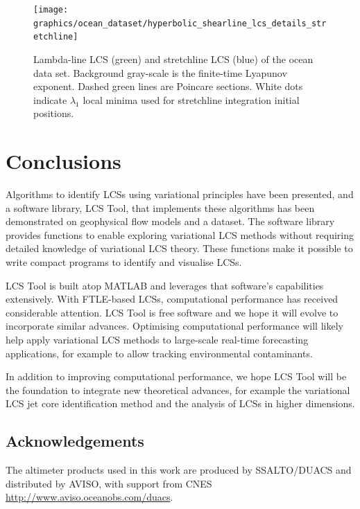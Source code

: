 \documentclass{article}
\begin{document}
\begin{figure}
\begin{center}
\texttt{[image: graphics/ocean\_dataset/hyperbolic\_shearline\_lcs\_details\_stretchline]}
\end{center}
\caption{Lambda-line LCS (green) and stretchline LCS (blue) of the ocean data set. Background gray-scale is the finite-time Lyapunov exponent. Dashed green lines are Poincare sections. White dots indicate $\lambda_1$ local minima used for stretchline integration initial positions.}
\label{f:ocean dataset hyperbolic shear lcs details stretchline}
\end{figure}

\clearpage

\section{Conclusions}

Algorithms to identify LCSs using variational principles have been presented, and a software library, LCS Tool, that implements these algorithms has been demonstrated on geophysical flow models and a dataset. The software library provides functions to enable exploring variational LCS methods without requiring detailed knowledge of variational LCS theory. These functions make it possible to write compact programs to identify and visualise LCSs.

LCS Tool is built atop MATLAB and leverages that software's capabilities extensively. With FTLE-based LCSs, computational performance has received considerable attention\parencite{conti12:_gpu_apu_finit_time_lyapun_expon,miron12:_anisot_lagran_coher_struc}. LCS Tool is free software and we hope it will evolve to incorporate similar advances. Optimising computational performance will likely help apply variational LCS methods to large-scale real-time forecasting applications, for example to allow tracking environmental contaminants.


In addition to improving computational performance, we hope LCS Tool will be the foundation to integrate new theoretical advances, for example the variational LCS jet core identification method\parencite{farazmand13:_shearless} and the 
analysis of LCSs in higher dimensions\parencite{blazevski:_hyper_ellip_trans_barrier_three}.

\subsection*{Acknowledgements}

The altimeter products used in this work are produced by SSALTO/DUACS and distributed by AVISO, with support from CNES \url{http://www.aviso.oceanobs.com/duacs}.

\printbibliography
\end{document}
